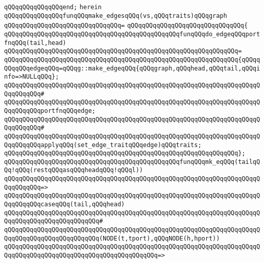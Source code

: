 \verb|qQQqqQQqqQQqqQQqend;|\newline
\newline
\verb|herein|\newline
\newline
\verb|qQQqqQQqqQQqqQQqfunqQQqmake_edgesqQQq(vs,qQQqtraits)qQQqgraph|\newline
\verb|qQQqqQQqqQQqqQQqqQQqqQQqqQQqqQQq=|\newline
\verb|qQQqqQQqqQQqqQQqqQQqqQQqqQQqqQQq{|\newline
\verb|qQQqqQQqqQQqqQQqqQQqqQQqqQQqqQQqqQQqqQQqqQQqqQQqfunqQQqdo_edgeqQQqportfnqQQq(tail,head)|\newline
\verb|qQQqqQQqqQQqqQQqqQQqqQQqqQQqqQQqqQQqqQQqqQQqqQQqqQQqqQQqqQQqqQQq=|\newline
\verb|qQQqqQQqqQQqqQQqqQQqqQQqqQQqqQQqqQQqqQQqqQQqqQQqqQQqqQQqqQQqqQQq{qQQqqQQqqQQqedgeqQQq=qQQqg::make_edgeqQQq{qQQqgraph,qQQqhead,qQQqtail,qQQqinfo=>NULLqQQq};|\newline
\verb|qQQqqQQqqQQqqQQqqQQqqQQqqQQqqQQqqQQqqQQqqQQqqQQqqQQqqQQqqQQqqQQqqQQqqQQqqQQqqQQq#|\newline
\verb|qQQqqQQqqQQqqQQqqQQqqQQqqQQqqQQqqQQqqQQqqQQqqQQqqQQqqQQqqQQqqQQqqQQqqQQqqQQqqQQqportfnqQQqedge;|\newline
\verb|qQQqqQQqqQQqqQQqqQQqqQQqqQQqqQQqqQQqqQQqqQQqqQQqqQQqqQQqqQQqqQQqqQQqqQQqqQQqqQQq#|\newline
\verb|qQQqqQQqqQQqqQQqqQQqqQQqqQQqqQQqqQQqqQQqqQQqqQQqqQQqqQQqqQQqqQQqqQQqqQQqqQQqqQQqapplyqQQq(set_edge_traitqQQqedge)qQQqtraits;|\newline
\verb|qQQqqQQqqQQqqQQqqQQqqQQqqQQqqQQqqQQqqQQqqQQqqQQqqQQqqQQqqQQqqQQq};|\newline
\newline
\verb|qQQqqQQqqQQqqQQqqQQqqQQqqQQqqQQqqQQqqQQqqQQqqQQqfunqQQqmk_eqQQq(tailqQQq!qQQq(restqQQqasqQQqheadqQQq!qQQql))|\newline
\verb|qQQqqQQqqQQqqQQqqQQqqQQqqQQqqQQqqQQqqQQqqQQqqQQqqQQqqQQqqQQqqQQqqQQqqQQqqQQqqQQq=>|\newline
\verb|qQQqqQQqqQQqqQQqqQQqqQQqqQQqqQQqqQQqqQQqqQQqqQQqqQQqqQQqqQQqqQQqqQQqqQQqqQQqqQQqcaseqQQq(tail,qQQqhead)|\newline
\verb|qQQqqQQqqQQqqQQqqQQqqQQqqQQqqQQqqQQqqQQqqQQqqQQqqQQqqQQqqQQqqQQqqQQqqQQqqQQqqQQqqQQqqQQqqQQqqQQq#|\newline
\verb|qQQqqQQqqQQqqQQqqQQqqQQqqQQqqQQqqQQqqQQqqQQqqQQqqQQqqQQqqQQqqQQqqQQqqQQqqQQqqQQqqQQqqQQqqQQqqQQq(NODE(t,tport),qQQqNODE(h,hport))|\newline
\verb|qQQqqQQqqQQqqQQqqQQqqQQqqQQqqQQqqQQqqQQqqQQqqQQqqQQqqQQqqQQqqQQqqQQqqQQqqQQqqQQqqQQqqQQqqQQqqQQqqQQqqQQqqQQqqQQq=>|\newline
